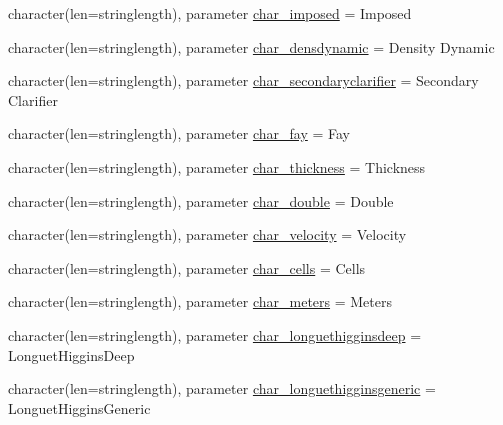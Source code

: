 \begin{DoxyCompactItemize}
\item 
character(len=stringlength), parameter \mbox{\hyperlink{namespacemodulelagrangianglobal_a071c642bc3b600b7de0906c055ca05fa}{char\+\_\+imposed}} = \textquotesingle{}Imposed\textquotesingle{}
\item 
character(len=stringlength), parameter \mbox{\hyperlink{namespacemodulelagrangianglobal_ab06fbdfc40ff183a187287310869ec5a}{char\+\_\+densdynamic}} = \textquotesingle{}Density Dynamic\textquotesingle{}
\item 
character(len=stringlength), parameter \mbox{\hyperlink{namespacemodulelagrangianglobal_aa3c5e2185217680ddbc27f6426874d57}{char\+\_\+secondaryclarifier}} = \textquotesingle{}Secondary Clarifier\textquotesingle{}
\item 
character(len=stringlength), parameter \mbox{\hyperlink{namespacemodulelagrangianglobal_a028d5f752e52b4a1faebf81afd4d5e27}{char\+\_\+fay}} = \textquotesingle{}Fay\textquotesingle{}
\item 
character(len=stringlength), parameter \mbox{\hyperlink{namespacemodulelagrangianglobal_a5e846ff4cd18510f8519319bdd545282}{char\+\_\+thickness}} = \textquotesingle{}Thickness\textquotesingle{}
\item 
character(len=stringlength), parameter \mbox{\hyperlink{namespacemodulelagrangianglobal_a74930488d66f9a63c6117790ad46dce3}{char\+\_\+double}} = \textquotesingle{}Double\textquotesingle{}
\item 
character(len=stringlength), parameter \mbox{\hyperlink{namespacemodulelagrangianglobal_ad93b7447e47a46a0ec00c0c44cf9c75a}{char\+\_\+velocity}} = \textquotesingle{}Velocity\textquotesingle{}
\item 
character(len=stringlength), parameter \mbox{\hyperlink{namespacemodulelagrangianglobal_aa2197bf29ce15cb5e251da0bd3e91d38}{char\+\_\+cells}} = \textquotesingle{}Cells\textquotesingle{}
\item 
character(len=stringlength), parameter \mbox{\hyperlink{namespacemodulelagrangianglobal_aca21ed6e256783fd2bc203d28621b62f}{char\+\_\+meters}} = \textquotesingle{}Meters\textquotesingle{}
\item 
character(len=stringlength), parameter \mbox{\hyperlink{namespacemodulelagrangianglobal_abab49ee7743fe04e5b6770213bca87f2}{char\+\_\+longuethigginsdeep}} = \textquotesingle{}Longuet\+Higgins\+Deep\textquotesingle{}
\item 
character(len=stringlength), parameter \mbox{\hyperlink{namespacemodulelagrangianglobal_aa4788b27197b9ed8b4b38824d6dd7c24}{char\+\_\+longuethigginsgeneric}} = \textquotesingle{}Longuet\+Higgins\+Generic\textquotesingle{}

\end{DoxyCompactItemize}
